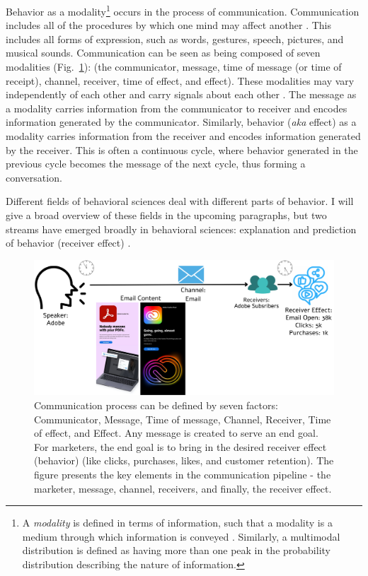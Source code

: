 \documentclass[PhD]{iiitd}
\renewcommand{\cite}[1]{\citep{#1}}
\begin{document}
Behavior as a modality\footnote{A \textit{modality} is defined in terms of information, such that a modality is a medium through which information is conveyed \cite{liang2022foundations,grifoni2009multimodal,martin2001annotation}. Similarly, a multimodal distribution is defined as having more than one peak in the probability distribution describing the nature of information.} occurs in the process of communication. Communication includes all of the procedures by which one mind may affect another \cite{shannon-weaver-1949}. This includes all forms of expression, such as words, gestures, speech, pictures, and musical sounds. Communication can be seen as being composed of seven modalities (Fig.~\ref{fig:factors-of-communication}): (the communicator, message, time of message (or time of receipt), channel, receiver, time of effect, and effect). These modalities may vary independently of each other \cite{khandelwal2023large,khurana-etal-2023-synthesizing,si2023long,khurana2023behavior} and carry signals about each other \cite{khurana-etal-2023-synthesizing,bhattacharya2023video}. The message as a modality carries information from the communicator to receiver and encodes information generated by the communicator. Similarly, behavior (\textit{aka} effect) as a modality carries information from the receiver and encodes information generated by the receiver. This is often a continuous cycle, where behavior generated in the previous cycle becomes the message of the next cycle, thus forming a conversation. 



Different fields of behavioral sciences deal with different parts of behavior. I will give a broad overview of these fields in the upcoming paragraphs, but two streams have emerged broadly in behavioral sciences: explanation and prediction of behavior (receiver effect) \cite{breiman2001statistical,hofman2017prediction,shmueli2010explain}. 


\begin{figure}[!t]
  \centering
  \includegraphics[width=1.0\textwidth]{images/factors of communication.pdf}
  \caption{Communication process can be defined by seven factors: Communicator, Message, Time of message, Channel, Receiver, Time of effect, and Effect. Any message is created to serve an end goal. For marketers, the end goal is to bring in the desired receiver effect (behavior) (like clicks, purchases, likes, and customer retention). The figure presents the key elements in the communication pipeline - the marketer, message, channel, receivers, and finally, the receiver effect.   \label{fig:factors-of-communication}}
\end{figure}
\end{document}
